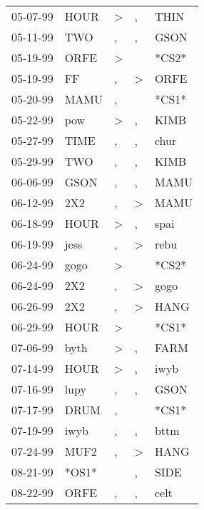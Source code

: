 \begin{supertabular}{lllll}
 05-07-99 &   HOUR &     \textgreater &                , &   THIN \\
 05-11-99 &    TWO &                , &                , &   GSON \\
 05-19-99 &   ORFE &     \textgreater &                  &  *CS2* \\
 05-19-99 &     FF &                , &     \textgreater &   ORFE \\
 05-20-99 &   MAMU &                , &                  &  *CS1* \\
 05-22-99 &    pow &     \textgreater &                , &   KIMB \\
 05-27-99 &   TIME &                , &                , &   chur \\
 05-29-99 &    TWO &                , &                , &   KIMB \\
 06-06-99 &   GSON &                , &                , &   MAMU \\
 06-12-99 &    2X2 &                , &     \textgreater &   MAMU \\
 06-18-99 &   HOUR &     \textgreater &                , &   spai \\
 06-19-99 &   jess &                , &     \textgreater &   rebu \\
 06-24-99 &   gogo &     \textgreater &                  &  *CS2* \\
 06-24-99 &    2X2 &                , &     \textgreater &   gogo \\
 06-26-99 &    2X2 &                , &     \textgreater &   HANG \\
 06-29-99 &   HOUR &     \textgreater &                  &  *CS1* \\
 07-06-99 &   byth &     \textgreater &                , &   FARM \\
 07-14-99 &   HOUR &     \textgreater &                , &   iwyb \\
 07-16-99 &   lupy &                , &                , &   GSON \\
 07-17-99 &   DRUM &                , &                  &  *CS1* \\
 07-19-99 &   iwyb &                , &                , &   bttm \\
 07-24-99 &   MUF2 &                , &     \textgreater &   HANG \\
 08-21-99 &  *OS1* &                  &                , &   SIDE \\
 08-22-99 &   ORFE &                , &                , &   celt \\

\end{supertabular}
